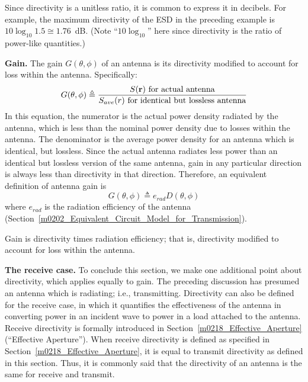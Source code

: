 
Since directivity is a unitless ratio, it is common to express it in decibels.  
For example, the maximum directivity of the ESD in the preceding example is $10\log_{10} 1.5 \cong 1.76$~dB.
(Note ``$10\log_{10}$'' here since directivity is the ratio of power-like quantities.)

{\bf Gain.}
The gain $G(\theta,\phi)$ of an antenna is its directivity modified to account for loss within the antenna.
Specifically:
%
\begin{equation}
G(\theta,\phi) \triangleq \frac{S({\bf r})~\mbox{for actual antenna}}{S_{ave}(r)~\mbox{for identical but lossless antenna}}
\end{equation}
%
In this equation, the numerator is the actual power density radiated by the antenna, which is less than the nominal power density due to losses within the antenna. 
The denominator is the average power density for an antenna which is identical, but lossless.
Since the actual antenna radiates less power than an identical but lossless version of the same antenna, gain in any particular direction is always less than directivity in that direction.
Therefore, an equivalent definition of antenna gain is
%
\begin{equation}
G(\theta,\phi) \triangleq e_{rad}D(\theta,\phi)
\end{equation}
%
where $e_{rad}$ is the radiation efficiency 
of the antenna (Section~\ref{m0202_Equivalent_Circuit_Model_for_Transmission}).

\begin{mdframed}[backgroundcolor=yellow!20,nobreak=true] 
Gain is directivity times radiation efficiency; that is, directivity modified to account for loss within the antenna.  
\end{mdframed}

{\bf The receive case.}
To conclude this section, we make one additional point about directivity, which applies equally to gain.
The preceding discussion has presumed an antenna which is radiating; i.e., transmitting.  
Directivity can also be defined for the receive case, in which it quantifies the effectiveness of the antenna in converting power in an incident wave to power in a load attached to the antenna.
Receive directivity is formally introduced in Section~\ref{m0218_Effective_Aperture} (``Effective Aperture'').
When receive directivity is defined as specified in Section~\ref{m0218_Effective_Aperture}, it is equal to transmit directivity as defined in this section. 
Thus, it is commonly said that the directivity of an antenna is the same for receive and transmit.  


